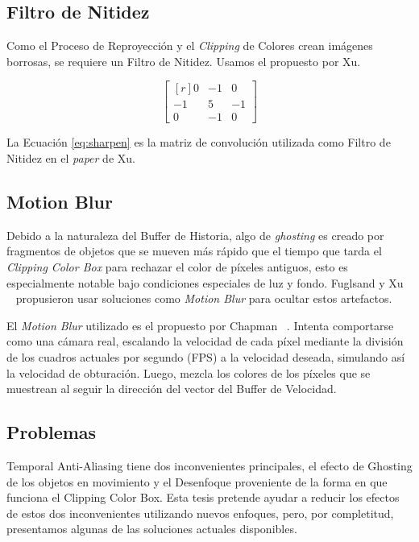 \documentclass{cslthse-msc}
\begin{document}
\subsection{Filtro de Nitidez} 
Como el Proceso de Reproyección y el \textit{Clipping} de Colores crean imágenes borrosas, se requiere un Filtro de Nitidez. Usamos el propuesto por Xu. ~\cite{XU2016}

\begin{equation} \label{eq:sharpen}
\begin{bmatrix*}[r]
0 & -1 &  0 \\
-1 &  5 & -1 \\
0 & -1 &  0
\end{bmatrix*}
\end{equation}

La Ecuación \ref{eq:sharpen} es la matriz de convolución utilizada como Filtro de Nitidez en el \textit{paper} de Xu. \protect\cite{XU2016}

\subsection{Motion Blur}
Debido a la naturaleza del Buffer de Historia, algo de \textit{ghosting} es creado por fragmentos de objetos que se mueven más rápido que el tiempo que tarda el \textit{Clipping Color Box} para rechazar el color de píxeles antiguos, esto es especialmente notable bajo condiciones especiales de luz y fondo. Fuglsand y Xu ~\cite{Fuglsand2016, XU2016} propusieron usar soluciones como \textit{Motion Blur} para ocultar estos artefactos.

El \textit{Motion Blur} utilizado es el propuesto por Chapman ~\cite{Chapman2012}. Intenta comportarse como una cámara real, escalando la velocidad de cada píxel mediante la división de los cuadros actuales por segundo (FPS) a la velocidad deseada, simulando así la velocidad de obturación. Luego, mezcla los colores de los píxeles que se muestrean al seguir la dirección del vector del Buffer de Velocidad.


\subsection{Problemas}
Temporal Anti-Aliasing tiene dos inconvenientes principales, el efecto de Ghosting de los objetos en movimiento y el Desenfoque proveniente de la forma en que funciona el Clipping Color Box. Esta tesis pretende ayudar a reducir los efectos de estos dos inconvenientes utilizando nuevos enfoques, pero, por completitud, presentamos algunas de las soluciones actuales disponibles.
\end{document}
